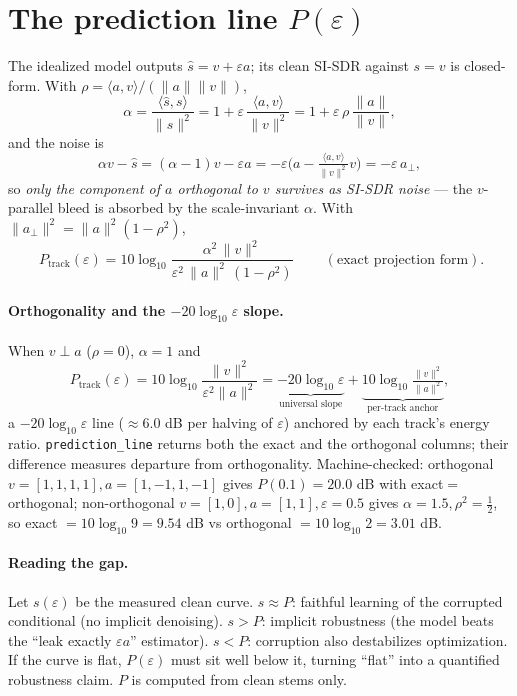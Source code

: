 \documentclass[11pt]{article}
\newcommand{\code}[1]{\texttt{#1}}
\newcommand{\eps}{\varepsilon}
\newcommand{\norm}[1]{\lVert #1 \rVert}
\newcommand{\inner}[2]{\langle #1,#2\rangle}
\begin{document}
\section{The prediction line $P(\eps)$}

The idealized model outputs $\hat s=v+\eps a$; its clean SI-SDR against $s=v$ is closed-form.
With $\rho=\inner{a}{v}/(\norm{a}\norm{v})$,
\begin{equation}
\alpha=\frac{\inner{\hat s}{s}}{\norm{s}^2}
   =1+\eps\,\frac{\inner{a}{v}}{\norm{v}^2}
   =1+\eps\,\rho\,\frac{\norm{a}}{\norm{v}},
\end{equation}
and the noise is
\begin{equation}
\alpha v-\hat s=(\alpha-1)v-\eps a
   =-\eps\Big(a-\tfrac{\inner{a}{v}}{\norm{v}^2}v\Big)=-\eps\,a_\perp,
\end{equation}
so \emph{only the component of $a$ orthogonal to $v$ survives as SI-SDR noise} --- the
$v$-parallel bleed is absorbed by the scale-invariant $\alpha$. With
$\norm{a_\perp}^2=\norm{a}^2(1-\rho^2)$,
\begin{equation}
\boxed{\ P_{\text{track}}(\eps)=10\log_{10}
   \frac{\alpha^2\,\norm{v}^2}{\eps^2\,\norm{a}^2\,(1-\rho^2)}\ }
\qquad(\text{exact projection form}).
\end{equation}

\paragraph{Orthogonality and the $-20\log_{10}\eps$ slope.} When $v\perp a$ ($\rho=0$),
$\alpha=1$ and
\begin{equation}
P_{\text{track}}(\eps)=10\log_{10}\frac{\norm{v}^2}{\eps^2\norm{a}^2}
   =\underbrace{-20\log_{10}\eps}_{\text{universal slope}}
   +\underbrace{10\log_{10}\tfrac{\norm{v}^2}{\norm{a}^2}}_{\text{per-track anchor}},
\end{equation}
a $-20\log_{10}\eps$ line ($\approx6.0$ dB per halving of $\eps$) anchored by each track's
energy ratio. \code{prediction\_line} returns both the exact and the orthogonal columns;
their difference measures departure from orthogonality. Machine-checked: orthogonal
$v=[1,1,1,1],a=[1,-1,1,-1]$ gives $P(0.1)=20.0$ dB with exact$=$orthogonal; non-orthogonal
$v=[1,0],a=[1,1],\eps=0.5$ gives $\alpha=1.5,\rho^2=\tfrac12$, so exact
$=10\log_{10}9=9.54$ dB vs orthogonal $=10\log_{10}2=3.01$ dB.

\paragraph{Reading the gap.} Let $s(\eps)$ be the measured clean curve. $s\approx P$:
faithful learning of the corrupted conditional (no implicit denoising). $s>P$: implicit
robustness (the model beats the ``leak exactly $\eps a$'' estimator). $s<P$: corruption
also destabilizes optimization. If the curve is flat, $P(\eps)$ must sit well below it,
turning ``flat'' into a quantified robustness claim. $P$ is computed from clean stems only.
\end{document}
